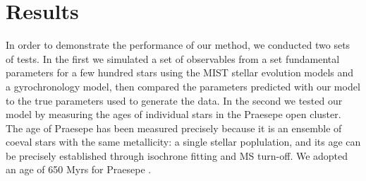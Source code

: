 \section{Results}
\label{section:results}

In order to demonstrate the performance of our method, we conducted two sets
of tests.
In the first we simulated a set of observables from a set fundamental
parameters for a few hundred stars using the MIST stellar evolution models and
a gyrochronology model, then compared the parameters predicted with our model
to the true parameters used to generate the data.
In the second we tested our model by measuring the ages of individual stars in
the Praesepe open cluster.
The age of Praesepe has been measured precisely because it is an ensemble of
coeval stars with the same metallicity: a single stellar poplulation, and its
age can be precisely established through isochrone fitting and MS turn-off.
We adopted an age of 650 Myrs for Praesepe \citep{fossati2008}.

